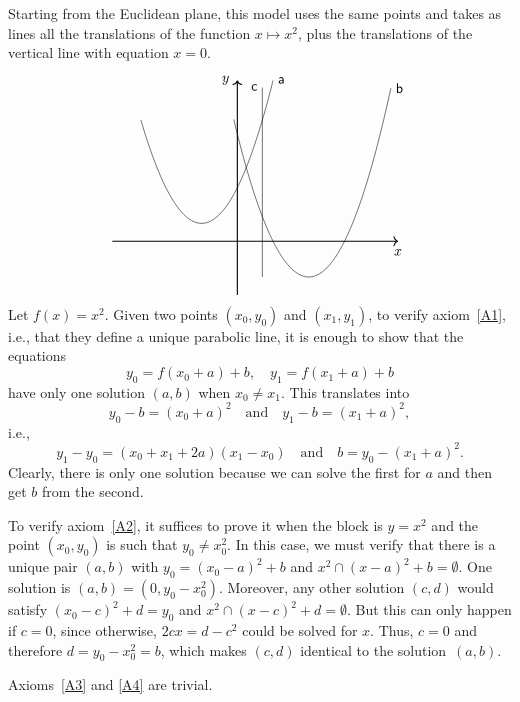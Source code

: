 \begin{xmpl}\label{xmpl:parabola-plane}{}
    Starting from the Euclidean plane, this model uses the same points and takes as lines all the translations of the function $x\mapsto x^2$, plus the translations of the vertical line with equation $x=0$.
    $$
        \begin{tikzpicture}[scale=0.9]
            \draw[->,thick] (-3.5,0) -- (4.5,0) node[below,yshift=-2pt] {$x$};
            \draw[->,thick] (0,-1.5) -- (0,4.5) node[left,xshift=-2pt] {$y$};
        
            \draw (0.7,-1) -- (0.7,4.3) node[left] {$\block c$};
        
            \draw[domain=-0.1:4.3, samples=100, smooth, variable=\x]
                plot ({\x}, {(\x-2)*(\x-2) - 1}) node[right] {$\block b$};
        
            \draw[domain=-2.7:1, samples=100, smooth, variable=\x]
                plot ({\x}, {(\x+1)*(\x+1) + 0.5}) node[right] {$\block a$};
        \end{tikzpicture}
    $$
    Let $f(x)=x^2$. Given two points $(x_0,y_0)$ and $(x_1,y_1)$, to verify axiom~\ref{A1}, i.e., that they define a unique parabolic line, it is enough to show that the equations
    $$
        y_0=f(x_0+a)+b,\quad y_1=f(x_1+a)+b
    $$
    have only one solution $(a,b)$ when $x_0\ne x_1$. This translates into
    $$
        y_0-b=(x_0+a)^2\quad\text{and}\quad y_1-b=(x_1+a)^2,
    $$
    i.e.,
    $$
        y_1-y_0=(x_0+x_1+2a)(x_1-x_0)\quad\text{and}\quad
            b=y_0-(x_1+a)^2.
    $$
    Clearly, there is only one solution because we can solve the first for $a$ and then get $b$ from the second.

    To verify axiom~\ref{A2}, it suffices to prove it when the block is $y=x^2$ and the point $(x_0,y_0)$ is such that $y_0\ne x_0^2$. In this case, we must verify that there is a unique pair $(a,b)$ with $y_0=(x_0-a)^2+b$ and $x^2\cap (x-a)^2+b=\emptyset$. One solution is $(a,b)=(0,y_0-x_0^2)$. Moreover, any other solution $(c,d)$ would satisfy $(x_0-c)^2+d=y_0$ and $x^2\cap(x-c)^2+d=\emptyset$. But this can only happen if $c=0$, since otherwise, $2cx=d-c^2$ could be solved for $x$. Thus, $c=0$ and therefore $d=y_0-x_0^2=b$, which makes $(c,d)$ identical to the solution~$(a,b)$.

    Axioms~\ref{A3} and \ref{A4} are trivial.
\end{xmpl}


